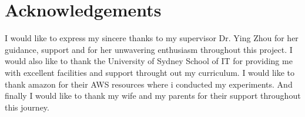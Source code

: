 \chapter*{Acknowledgements}

I would like to express my sincere thanks to my supervisor Dr. Ying
Zhou for her guidance, support and for her unwavering enthusiasm throughout
this project. I would also like to thank the University of Sydney School of IT for providing me
with excellent facilities and support throught out my curriculum. I
would like to thank amazon for their AWS resources where i conducted
my experiments. And finally I  would like to thank my wife and my
parents for their support throughout this journey.
